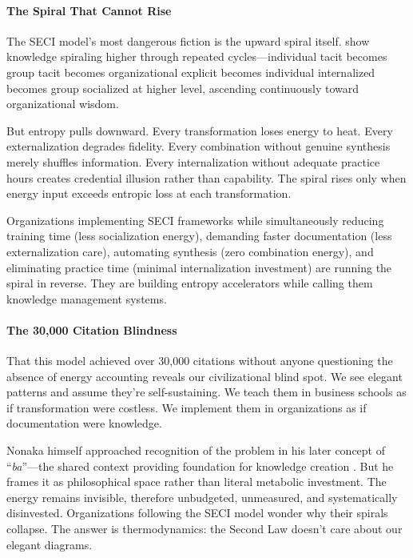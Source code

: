 \paragraph{The Spiral That Cannot Rise}

The SECI model's most dangerous fiction is the upward spiral itself. \citeauthor{nonaka1995knowledge} show knowledge spiraling higher through repeated cycles---individual tacit becomes group tacit becomes organizational explicit becomes individual internalized becomes group socialized at higher level, ascending continuously toward organizational wisdom.

But entropy pulls downward. Every transformation loses energy to heat. Every externalization degrades fidelity. Every combination without genuine synthesis merely shuffles information. Every internalization without adequate practice hours creates credential illusion rather than capability. The spiral rises only when energy input exceeds entropic loss at each transformation.

Organizations implementing SECI frameworks while simultaneously reducing training time (less socialization energy), demanding faster documentation (less externalization care), automating synthesis (zero combination energy), and eliminating practice time (minimal internalization investment) are running the spiral in reverse. They are building entropy accelerators while calling them knowledge management systems.

\paragraph{The 30,000 Citation Blindness}

That this model achieved over 30,000 citations without anyone questioning the absence of energy accounting reveals our civilizational blind spot. We see elegant patterns and assume they're self-sustaining. We teach them in business schools as if transformation were costless. We implement them in organizations as if documentation were knowledge.

Nonaka himself approached recognition of the problem in his later concept of ``\textit{ba}''---the shared context providing foundation for knowledge creation \citep{nonaka1998ba}. But he frames it as philosophical space rather than literal metabolic investment. The energy remains invisible, therefore unbudgeted, unmeasured, and systematically disinvested. Organizations following the SECI model wonder why their spirals collapse. The answer is thermodynamics: the Second Law doesn't care about our elegant diagrams.

